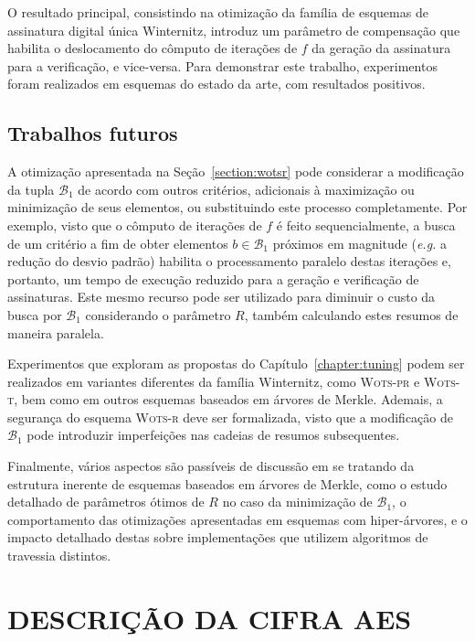 \documentclass{ufsctex/ufsctex}
\newcommand{\bone}{\mathcal{B}_{1}}
\newcommand{\wotsprf}{\textsc{Wots-pr}}
\newcommand{\wotst}{\textsc{Wots-t}}
\newcommand{\wotsr}{\textsc{Wots-r}}
\begin{document}
O resultado principal, consistindo na otimização da família de esquemas de
assinatura digital única Winternitz, introduz um parâmetro de compensação que
habilita o deslocamento do cômputo de iterações de $f$ da geração da assinatura
para a verificação, e vice-versa. Para demonstrar este trabalho, experimentos
foram realizados em esquemas do estado da arte, com resultados positivos.

\section{Trabalhos futuros}\label{section:future}

A otimização apresentada na Seção~\ref{section:wotsr} pode considerar a
modificação da tupla $\bone{}$ de acordo com outros critérios, adicionais à
maximização ou minimização de seus elementos, ou substituindo este processo
completamente. Por exemplo, visto que o cômputo de iterações de $f$ é feito
sequencialmente, a busca de um critério a fim de obter elementos $b \in
\bone{}$ próximos em magnitude (\emph{e.g.} a redução do desvio padrão)
habilita o processamento paralelo destas iterações e, portanto, um tempo de
execução reduzido para a geração e verificação de assinaturas. Este mesmo
recurso pode ser utilizado para diminuir o custo da busca por $\bone{}$
considerando o parâmetro $R$, também calculando estes resumos de maneira
paralela.

Experimentos que exploram as propostas do Capítulo~\ref{chapter:tuning} podem
ser realizados em variantes diferentes da família Winternitz, como \wotsprf{} e
\wotst{}, bem como em outros esquemas baseados em árvores de Merkle. Ademais, a
segurança do esquema \wotsr{} deve ser formalizada, visto que a modificação de
$\bone{}$ pode introduzir imperfeições nas cadeias de resumos subsequentes.

Finalmente, vários aspectos são passíveis de discussão em se tratando da
estrutura inerente de esquemas baseados em árvores de Merkle, como o estudo
detalhado de parâmetros ótimos de $R$ no caso da minimização de $\bone{}$, o
comportamento das otimizações apresentadas em esquemas com hiper-árvores, e o
impacto detalhado destas sobre implementações que utilizem algoritmos de
travessia distintos.




\apendice

\chapter{DESCRIÇÃO DA CIFRA AES}\label{chapter:aes}
\end{document}
